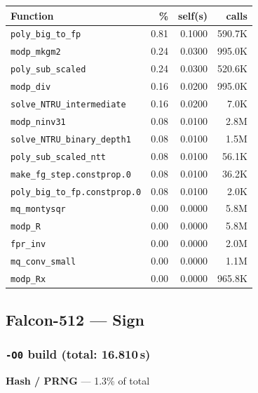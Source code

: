 \documentclass[11pt,a4paper]{article}
\begin{document}
\begin{longtable}{p{7.5cm}rrr}
\toprule
Function & \% & self(s) & calls \\
\midrule
\endhead
  \texttt{poly\_big\_to\_fp} & 0.81 & 0.1000 & 590.7K \\
  \texttt{modp\_mkgm2} & 0.24 & 0.0300 & 995.0K \\
  \texttt{poly\_sub\_scaled} & 0.24 & 0.0300 & 520.6K \\
  \texttt{modp\_div} & 0.16 & 0.0200 & 995.0K \\
  \texttt{solve\_NTRU\_intermediate} & 0.16 & 0.0200 & 7.0K \\
  \texttt{modp\_ninv31} & 0.08 & 0.0100 & 2.8M \\
  \texttt{solve\_NTRU\_binary\_depth1} & 0.08 & 0.0100 & 1.5M \\
  \texttt{poly\_sub\_scaled\_ntt} & 0.08 & 0.0100 & 56.1K \\
  \texttt{make\_fg\_step.constprop.0} & 0.08 & 0.0100 & 36.2K \\
  \texttt{poly\_big\_to\_fp.constprop.0} & 0.08 & 0.0100 & 2.0K \\
  \texttt{mq\_montysqr} & 0.00 & 0.0000 & 5.8M \\
  \texttt{modp\_R} & 0.00 & 0.0000 & 5.8M \\
  \texttt{fpr\_inv} & 0.00 & 0.0000 & 2.0M \\
  \texttt{mq\_conv\_small} & 0.00 & 0.0000 & 1.1M \\
  \texttt{modp\_Rx} & 0.00 & 0.0000 & 965.8K \\
\bottomrule
\end{longtable}

\subsection{Falcon-512 --- Sign}

\subsubsection*{\texttt{-O0} build (total: 16.810\,s)}

\noindent\colorbox{hashcolor}{\strut \textbf{Hash / PRNG} --- 1.3\% of total}
\vspace{2pt}
\end{document}
